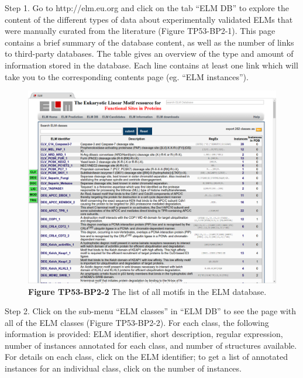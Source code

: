 Step 1. Go to http://elm.eu.org and click on the tab ``ELM DB'' to
explore the content of the different types of data about experimentally
validated ELMs that were manually curated from the literature (Figure
TP53-BP2-1). This page contains a brief summary of the database content,
as well as the number of links to third-party databases. The table gives
an overview of the type and amount of information stored in the
database. Each line contains at least one link which will take you to
the corresponding contents page (eg. ``ELM instances'').

\begin{figure}[h!]
\centering
\includegraphics[width=\textwidth]{Figures/TP53_2/elms.png} 
\caption{
\textbf{Figure TP53-BP2-2}
The list of all motifs in the ELM database.
}
\end{figure}

Step 2. Click on the sub-menu ``ELM classes'' in ``ELM DB'' to see the
page with all of the ELM classes (Figure TP53-BP2-2). For each class,
the following information is provided: ELM identifier, short
description, regular expression, number of instances annotated for each
class, and number of structures available. For details on each class,
click on the ELM identifier; to get a list of annotated instances for an
individual class, click on the number of instances.



